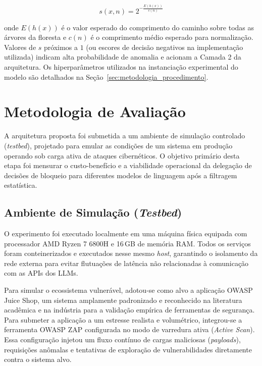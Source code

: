 \documentclass[sigconf, anonymous]{acmart}
\begin{document}
$$s(x, n) = 2^{-\frac{E(h(x))}{c(n)}}$$

onde $E(h(x))$ é o valor esperado do comprimento do caminho sobre todas as árvores da floresta e $c(n)$ é o comprimento médio esperado para normalização. Valores de $s$ próximos a $1$ (ou escores de decisão negativos na implementação utilizada) indicam alta probabilidade de anomalia e acionam a Camada 2 da arquitetura. Os hiperparâmetros utilizados na instanciação experimental do modelo são detalhados na Seção~\ref{sec:metodologia_procedimento}.

\section{Metodologia de Avaliação}
\label{sec:metodologia}

A arquitetura proposta foi submetida a um ambiente de simulação controlado (\textit{testbed}), projetado para emular as condições de um sistema em produção operando sob carga ativa de ataques cibernéticos. O objetivo primário desta etapa foi mensurar o custo-benefício e a viabilidade operacional da delegação de decisões de bloqueio para diferentes modelos de linguagem após a filtragem estatística.

\subsection{Ambiente de Simulação (\textit{Testbed})}
\label{sec:metodologia_ambiente}

O experimento foi executado localmente em uma máquina física equipada com processador AMD Ryzen 7 6800H e 16\,GB de memória RAM. Todos os serviços foram conteinerizados e executados nesse mesmo \textit{host}, garantindo o isolamento da rede externa para evitar flutuações de latência não relacionadas à comunicação com as \acp{API} dos \acp{LLM}.

Para simular o ecossistema vulnerável, adotou-se como alvo a aplicação OWASP Juice Shop, um sistema amplamente padronizado e reconhecido na literatura acadêmica e na indústria para a validação empírica de ferramentas de segurança. Para submeter a aplicação a um estresse realista e volumétrico, integrou-se a ferramenta OWASP ZAP configurada no modo de varredura ativa (\textit{Active Scan}). Essa configuração injetou um fluxo contínuo de cargas maliciosas (\textit{payloads}), requisições anômalas e tentativas de exploração de vulnerabilidades diretamente contra o sistema alvo.
\end{document}
